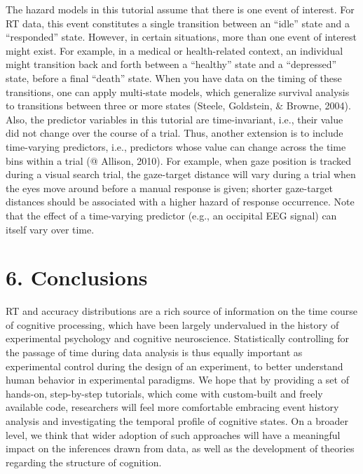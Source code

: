 \documentclass[
  man,floatsintext]{apa6}
\begin{document}
The hazard models in this tutorial assume that there is one event of interest. For RT data, this event constitutes a single transition between an ``idle'' state and a ``responded'' state. However, in certain situations, more than one event of interest might exist. For example, in a medical or health-related context, an individual might transition back and forth between a ``healthy'' state and a ``depressed'' state, before a final ``death'' state. When you have data on the timing of these transitions, one can apply multi-state models, which generalize survival analysis to transitions between three or more states (Steele, Goldstein, \& Browne, 2004).
Also, the predictor variables in this tutorial are time-invariant, i.e., their value did not change over the course of a trial. Thus, another extension is to include time-varying predictors, i.e., predictors whose value can change across the time bins within a trial (@ Allison, 2010). For example, when gaze position is tracked during a visual search trial, the gaze-target distance will vary during a trial when the eyes move around before a manual response is given; shorter gaze-target distances should be associated with a higher hazard of response occurrence. Note that the effect of a time-varying predictor (e.g., an occipital EEG signal) can itself vary over time.

\section{6. Conclusions}\label{conclusions}

RT and accuracy distributions are a rich source of information on the time course of cognitive processing, which have been largely undervalued in the history of experimental psychology and cognitive neuroscience. Statistically controlling for the passage of time during data analysis is thus equally important as experimental control during the design of an experiment, to better understand human behavior in experimental paradigms. We hope that by providing a set of hands-on, step-by-step tutorials, which come with custom-built and freely available code, researchers will feel more comfortable embracing event history analysis and investigating the temporal profile of cognitive states. On a broader level, we think that wider adoption of such approaches will have a meaningful impact on the inferences drawn from data, as well as the development of theories regarding the structure of cognition.

\newpage
\end{document}
